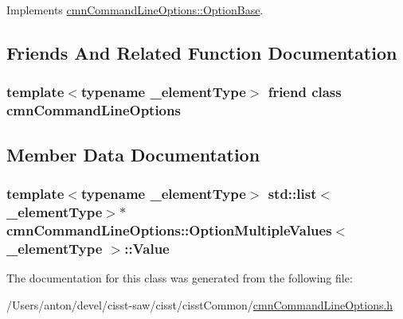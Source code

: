 Implements \hyperlink{classcmn_command_line_options_1_1_option_base_a738dbf56caefe3ee0f5eb9c3cc33bdd6}{cmn\+Command\+Line\+Options\+::\+Option\+Base}.



\subsection{Friends And Related Function Documentation}
\hypertarget{classcmn_command_line_options_1_1_option_multiple_values_a18923f23ed3914806f1edf878a64b422}{}
\subsubsection[{cmn\+Command\+Line\+Options}]{\setlength{\rightskip}{0pt plus 5cm}template$<$typename \+\_\+element\+Type$>$ friend class {\bf cmn\+Command\+Line\+Options}\hspace{0.3cm}{\ttfamily [friend]}}\label{classcmn_command_line_options_1_1_option_multiple_values_a18923f23ed3914806f1edf878a64b422}


\subsection{Member Data Documentation}
\hypertarget{classcmn_command_line_options_1_1_option_multiple_values_adde8989719b8006a0c8569cd9480a945}{}
\subsubsection[{Value}]{\setlength{\rightskip}{0pt plus 5cm}template$<$typename \+\_\+element\+Type$>$ std\+::list$<$\+\_\+element\+Type$>$$\ast$ {\bf cmn\+Command\+Line\+Options\+::\+Option\+Multiple\+Values}$<$ \+\_\+element\+Type $>$\+::Value\hspace{0.3cm}{\ttfamily [protected]}}\label{classcmn_command_line_options_1_1_option_multiple_values_adde8989719b8006a0c8569cd9480a945}


The documentation for this class was generated from the following file\+:\begin{DoxyCompactItemize}
\item 
/\+Users/anton/devel/cisst-\/saw/cisst/cisst\+Common/\hyperlink{cmn_command_line_options_8h}{cmn\+Command\+Line\+Options.\+h}\end{DoxyCompactItemize}
